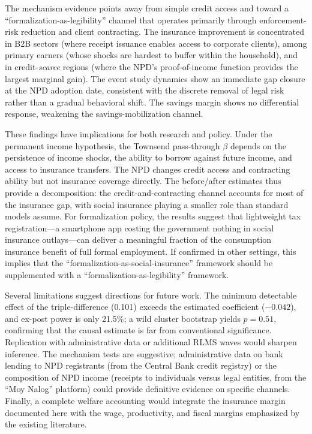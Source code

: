 \documentclass[12pt]{article}
\begin{document}
The mechanism evidence points away from simple credit access and toward a ``formalization-as-legibility'' channel that operates primarily through enforcement-risk reduction and client contracting. The insurance improvement is concentrated in B2B sectors (where receipt issuance enables access to corporate clients), among primary earners (whose shocks are hardest to buffer within the household), and in credit-\textit{scarce} regions (where the NPD's proof-of-income function provides the largest marginal gain). The event study dynamics show an immediate gap closure at the NPD adoption date, consistent with the discrete removal of legal risk rather than a gradual behavioral shift. The savings margin shows no differential response, weakening the savings-mobilization channel.

These findings have implications for both research and policy. Under the permanent income hypothesis, the Townsend pass-through $\beta$ depends on the persistence of income shocks, the ability to borrow against future income, and access to insurance transfers. The NPD changes credit access and contracting ability but not insurance coverage directly. The before/after estimates thus provide a decomposition: the credit-and-contracting channel accounts for most of the insurance gap, with social insurance playing a smaller role than standard models assume. For formalization policy, the results suggest that lightweight tax registration---a smartphone app costing the government nothing in social insurance outlays---can deliver a meaningful fraction of the consumption insurance benefit of full formal employment. If confirmed in other settings, this implies that the ``formalization-as-social-insurance'' framework should be supplemented with a ``formalization-as-legibility'' framework.

Several limitations suggest directions for future work. The minimum detectable effect of the triple-difference (0.101) exceeds the estimated coefficient ($-0.042$), and ex-post power is only 21.5\%; a wild cluster bootstrap yields $p = 0.51$, confirming that the causal estimate is far from conventional significance. Replication with administrative data or additional RLMS waves would sharpen inference. The mechanism tests are suggestive; administrative data on bank lending to NPD registrants (from the Central Bank credit registry) or the composition of NPD income (receipts to individuals versus legal entities, from the ``Moy Nalog'' platform) could provide definitive evidence on specific channels. Finally, a complete welfare accounting would integrate the insurance margin documented here with the wage, productivity, and fiscal margins emphasized by the existing literature.
\end{document}
